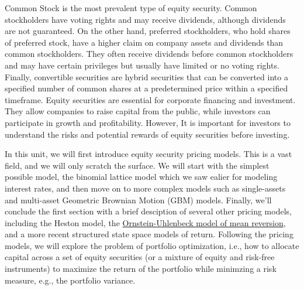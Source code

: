 \documentclass[11pt]{article}
\theoremstyle{definition}
\begin{document}
Common Stock is the most prevalent type of equity security. Common stockholders have voting rights and may receive dividends, although dividends are not guaranteed.
On the other hand, preferred stockholders, who hold shares of preferred stock,  have a higher claim on company assets and dividends than common stockholders. 
They often receive dividends before common stockholders and may have certain privileges but usually have limited or no voting rights.
Finally, convertible securities are hybrid securities that can be converted into a specified number of common shares at a predetermined price within a specified timeframe.
Equity securities are essential for corporate financing and investment. They allow companies to raise capital from the public, while investors can participate in growth and profitability. 
However, It is important for investors to understand the risks and potential rewards of equity securities before investing.

In this unit, we will first introduce equity security pricing models. This is a vast field, and we will only scratch the surface. 
We will start with the simplest possible model, the binomial lattice model which we saw ealier for modeling interest rates, and then move on to more complex models such as single-assets and multi-asset Geometric Brownian Motion (GBM) models.
Finally, we'll conclude the first section with a brief desciption of several other pricing models, including the Heston model, the \href{https://en.wikipedia.org/wiki/Ornstein%E2%80%93Uhlenbeck_process}{Ornstein-Uhlenbeck model of mean reversion}, 
and a more recent structured state space models of return. 
Following the pricing models, we will explore the problem of portfolio optimization, 
i.e., how to allocate capital across a set of equity securities (or a mixture of equity and risk-free instruments) to maximize the return of the portfolio while minimzing a risk measure, e.g., the portfolio variance.
\end{document}
